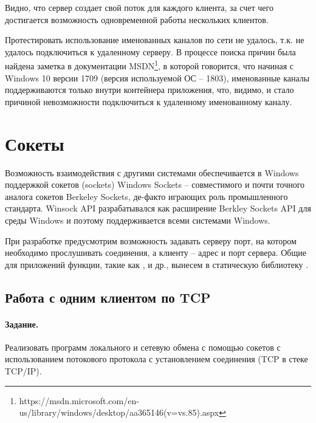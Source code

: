 

Видно, что сервер создает свой поток для каждого клиента, за счет чего достигается возможность одновременной работы нескольких клиентов.

Протестировать использование именованных каналов по сети не удалось, т.к. не удалось подключиться к удаленному серверу. В процессе поиска причин была найдена заметка в документации MSDN\footnote{https://msdn.microsoft.com/en-us/library/windows/desktop/aa365146(v=vs.85).aspx}, в которой говорится, что начиная с Windows 10 версии 1709 (версия используемой ОС -- 1803), именованные каналы поддерживаются только внутри контейнера приложения, что, видимо, и стало причиной невозможности подключиться к удаленному именованному каналу.

\newpage

\section{Сокеты}

Возможность взаимодействия с другими системами обеспечивается в Windows поддержкой сокетов (sockets) Windows Sockets -- совместимого и почти точного аналога сокетов Berkeley Sockets, де-факто играющих роль промышленного стандарта. Winsock API разрабатывался как расширение Berkley Sockets API для среды Windows и поэтому поддерживается всеми системами Windows.

При разработке предусмотрим возможность задавать серверу порт, на котором необходимо прослушивать соединения, а клиенту -- адрес и порт сервера. Общие для приложений функции, такие как ,  и др., вынесем в статическую библиотеку .





\subsection{Работа с одним клиентом по TCP}

\paragraph{Задание.} Реализовать программ локального и сетевую обмена с помощью сокетов с использованием потокового протокола с установлением соединения (TCP в стеке TCP/IP).


